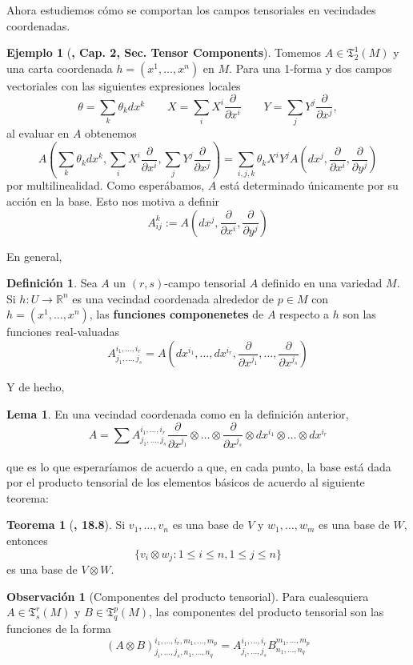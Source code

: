 \documentclass[spanish]{book}
\theoremstyle{definition}
\newtheorem*{defn}{Definición}
\newtheorem*{teo}{Teorema}
\newtheorem*{lema}{Lema}
\newtheorem*{obs}{Observación}
\newtheorem*{ejem}{Ejemplo}
\newcommand{\R}{\mathbb{R}}
\newcommand{\T}{\mathfrak{T}}
\begin{document}
	Ahora estudiemos cómo se comportan los campos tensoriales en vecindades coordenadas.
	\begin{ejem}[\cite{ONeill}\textbf{, Cap. 2, Sec. Tensor Components}]
		Tomemos $A\in\T^1_2(M)$ y una carta coordenada $h=(x^1,\ldots,x^n)$ en $M$. Para una 1-forma y dos campos vectoriales con las siguientes expresiones locales
		\[\theta=\sum_k\theta_kdx^k\qquad X=\sum_i X^i\frac{\partial}{\partial x^i}\qquad Y=\sum_j Y^j\frac{\partial}{\partial x^j},\]
		al evaluar en $A$ obtenemos
		\[A\left(\sum_k\theta_kdx^k,\sum_i X^i\frac{\partial}{\partial x^i},\sum_j Y^j\frac{\partial}{\partial x^j}\right)=\sum_{i,j,k}\theta_kX^iY^jA\left(dx^j,\frac{\partial}{\partial x^i},\frac{\partial}{\partial y^j}\right)\]
		por multilinealidad. Como esperábamos, $A$ está determinado únicamente por su acción en la base. Esto nos motiva a definir
		\[A_{ij}^k:=A\left(dx^j,\frac{\partial}{\partial x^i},\frac{\partial}{\partial y^j}\right)\]
	\end{ejem}
	En general,
	\begin{defn}
		Sea $A$ un $(r,s)$-campo tensorial $A$ definido en una variedad $M$. Si ${h:U\to\R^n}$ es una vecindad coordenada alrededor de $p\in M$ con $h=(x^1,\ldots,x^n)$, las \textbf{funciones componenetes} de $A$ respecto a $h$ son las funciones real-valuadas
		\[A^{i_1,\ldots,i_r}_{j_1,\ldots,j_s}=A\left(dx^{i_1},\ldots,dx^{i_r},\frac{\partial}{\partial x^{j_1}},\ldots,\frac{\partial}{\partial x^{j_s}}\right)\]
	\end{defn}
	Y de hecho,
	\begin{lema}
		En una vecindad coordenada como en la definición anterior,
		\[A=\sum A^{i_1,\ldots,i_r}_{j_1,\ldots,j_s}\frac{\partial}{\partial x^{j_1}}\otimes\ldots\otimes\frac{\partial}{\partial x^{j_s}}\otimes dx^{i_1}\otimes\ldots\otimes dx^{i_r}\]
	\end{lema}
	que es lo que esperaríamos de acuerdo a que, en cada punto, la base está dada por el producto tensorial de los elementos básicos de acuerdo al siguiente teorema:
		\begin{teo}[\cite{Loring-dif}\textbf{, 18.8}]
				Si $v_1,\ldots,v_n$ es una base de $V$ y $w_1,\ldots,w_m$ es una base de $W$, entonces
				\[\{v_i\otimes w_j:1\leq i\leq n,1\leq j\leq n\}\]
				es una base de $V\otimes W$.
		\end{teo}
		\begin{obs}[Componentes del producto tensorial]
			Para cualesquiera $A\in\T^r_s(M)$ y $B\in\T^p_q(M)$, las componentes del producto tensorial son las funciones de la forma
			\[(A\otimes B)^{i_1,\ldots,i_r,m_1,\ldots,m_p}_{j_i,\ldots,j_s,n_1,\ldots,n_q}=A^{i_1,\ldots,i_r}_{j_i,\ldots,j_s}B^{m_1,\ldots,m_p}_{n_1,\ldots,n_q}\]
		\end{obs}
\end{document}
